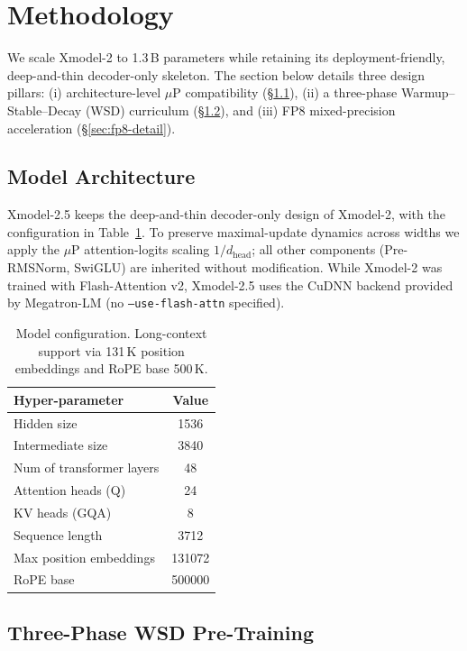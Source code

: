 \section{Methodology}\label{sec:method}

We scale Xmodel-2 to 1.3\,B parameters while retaining its deployment-friendly, deep-and-thin decoder-only skeleton.
The section below details three design pillars:
(i) architecture-level $\mu$P compatibility (\S\ref{sec:arch}),
(ii) a three-phase Warmup--Stable--Decay (WSD) curriculum (\S\ref{sec:wsd}), and
(iii) FP8 mixed-precision acceleration (\S\ref{sec:fp8-detail}).

\subsection{Model Architecture}\label{sec:arch}
Xmodel-2.5 keeps the deep-and-thin decoder-only design of Xmodel-2, with the configuration in Table~\ref{tab:config}.
To preserve maximal-update dynamics across widths we apply the $\mu$P attention-logits scaling $1/d_{\text{head}}$; all other components (Pre-RMSNorm, SwiGLU) are inherited without modification.
While Xmodel-2 was trained with Flash-Attention v2, Xmodel-2.5 uses the CuDNN backend provided by Megatron-LM (no \texttt{--use-flash-attn} specified).

\begin{table}[htbp]
\centering
\small
\begin{tabular}{lc}
\toprule
\textbf{Hyper-parameter} & \textbf{Value} \\
\midrule
Hidden size & 1536 \\
Intermediate size & 3840 \\
Num of transformer layers & 48 \\
Attention heads (Q) & 24 \\
KV heads (GQA) & 8 \\
Sequence length & 3712 \\
Max position embeddings & 131072 \\
RoPE base & 500000 \\
\bottomrule
\end{tabular}
\caption{Model configuration. {\footnotesize Long-context support via 131\,K position embeddings and RoPE base 500\,K.}}
\label{tab:config}
\end{table}

\subsection{Three-Phase WSD Pre-Training}\label{sec:wsd}

